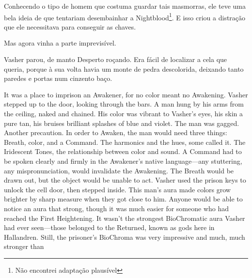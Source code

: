 \documentclass[11pt,a4paper]{book}
\begin{document}
Conhecendo o tipo de homem que costuma guardar tais masmorras, ele teve uma bela ideia de que tentariam desembainhar a Nightblood\footnote{Não encontrei adaptação plausível}. E isso criou a distração que ele necessitava para conseguir as chaves.

Mas agora vinha a parte imprevisível.

Vasher parou, de manto Desperto roçando. Era fácil de localizar a cela que queria, porque à sua volta havia um monte de pedra descolorida, deixando tanto paredes e portas num cinzento baço.

 It was a place to imprison an Awakener, for no color meant no Awakening. Vasher stepped up to the door, looking through the bars. A man hung by his arms from the ceiling, naked and chained. His color was vibrant to Vasher’s eyes, his skin a pure tan, his bruises brilliant splashes of blue and violet.
The man was gagged. Another precaution. In order to Awaken, the man would need three things: Breath, color, and a Command. The harmonics and the hues, some called it. The Iridescent Tones, the relationship between color and sound. A Command had to be spoken clearly and firmly in the Awakener’s native language—any stuttering, any mispronunciation, would invalidate the Awakening. The Breath would be drawn out, but the object would be unable to act.
Vasher used the prison keys to unlock the cell door, then stepped inside. This man’s aura made colors grow brighter by sharp measure when they got close to him. Anyone would be able to notice an aura that strong, though it was much easier for someone who had reached the First Heightening.
It wasn’t the strongest BioChromatic aura Vasher had ever seen—those belonged to the Returned, known as gods here in Hallandren. Still, the prisoner’s BioChroma was very impressive and much, much stronger than
\end{document}
